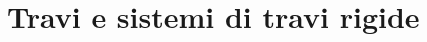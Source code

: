\documentclass[11pt,a4paper]{book}
\begin{document}
\part{Travi e sistemi di travi rigide}


%
%
%
\end{document}
